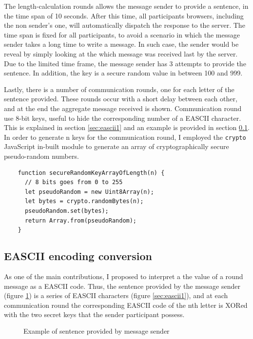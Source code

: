 The length-calculation rounds allows the message sender to provide a sentence, in the time span of 10 seconds. After this time, all participants browsers, including the non sender's one, will automatically dispatch the response to the server. The time span is fixed for all participants, to avoid a scenario in which the message sender takes a long time to write a message. In such case, the sender would be reveal by simply looking at the which message was received last by the server. Due to the limited time frame, the message sender has 3 attempts to provide the sentence. In addition, the key is a secure random value in between 100 and 999. 

Lastly, there is a number of communication rounds, one for each letter of the sentence provided. These rounds occur with a short delay between each other, and at the end the aggregate message received is shown. Communication round use 8-bit keys, useful to hide the corresponding number of a EASCII character. This is explained in section \ref{sec:eascii1} and an example is provided in section \ref{sec:easciiExample1}. In order to generate n keys for the communication round, I employed the \lstinline{crypto} JavaScript in-built module to generate an array of cryptographically secure pseudo-random numbers.

\begin{lstlisting}
    function secureRandomKeyArrayOfLength(n) {
      // 8 bits goes from 0 to 255
      let pseudoRandom = new Uint8Array(n);
      let bytes = crypto.randomBytes(n);
      pseudoRandom.set(bytes);
      return Array.from(pseudoRandom);
    }
\end{lstlisting}


\subsection{EASCII encoding conversion} \label{sec:easciiExample1}
As one of the main contributions, I proposed to interpret a the value of a round message as a EASCII code. Thus, the sentence provided by the message sender (figure \ref{fig:exampleMessage}) is a series of EASCII characters (figure \ref{sec:eascii1}), and at each communication round the corresponding EASCII code of the nth letter is XORed with the two secret keys that the sender participant possess.

\begin{figure}[H]
    \centering
    \caption{Example of sentence provided by message sender }
    \label{fig:exampleMessage}
\end{figure}


